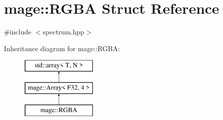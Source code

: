 \hypertarget{structmage_1_1_r_g_b_a}{}\section{mage\+:\+:R\+G\+BA Struct Reference}
\label{structmage_1_1_r_g_b_a}


{\ttfamily \#include $<$spectrum.\+hpp$>$}

Inheritance diagram for mage\+:\+:R\+G\+BA\+:\begin{figure}[H]
\begin{center}
\leavevmode
\includegraphics[height=3.000000cm]{structmage_1_1_r_g_b_a}
\end{center}
\end{figure}
